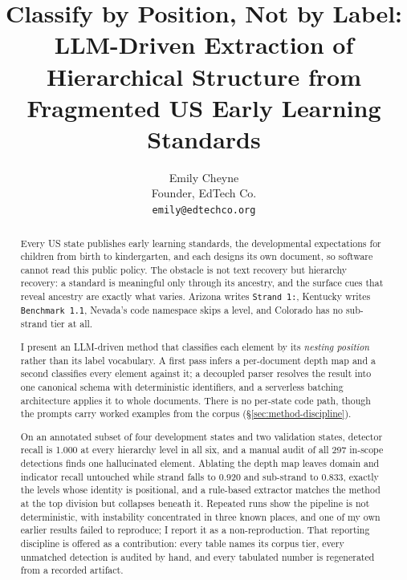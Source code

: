 \documentclass[11pt]{article}
\title{Classify by Position, Not by Label: LLM-Driven Extraction of Hierarchical Structure from Fragmented US Early Learning Standards}
\author{
  Emily Cheyne \\
  Founder, EdTech Co. \\
  \texttt{emily@edtechco.org}
}
\begin{document}
\maketitle

\begin{abstract}
Every US state publishes early learning standards, the developmental
expectations for children from birth to kindergarten, and each designs its
own document, so software cannot read this public policy. The obstacle is not
text recovery but hierarchy recovery: a standard is meaningful only through its
ancestry, and the surface cues that reveal ancestry are exactly what varies.
Arizona writes \texttt{Strand 1:}, Kentucky writes \texttt{Benchmark 1.1},
Nevada's code namespace skips a level, and Colorado has no sub-strand tier at
all.

I present an LLM-driven method that classifies each element by its
\emph{nesting position} rather than its label vocabulary. A first pass infers a
per-document depth map and a second classifies every element against it; a
decoupled parser resolves the result into one canonical schema with
deterministic identifiers, and a serverless batching
architecture applies it to whole documents. There is no per-state code path,
though the prompts carry worked examples from the corpus
(\S\ref{sec:method-discipline}).

On an annotated subset of four development states and two validation states,
detector recall is 1.000 at every hierarchy level in all six, and a manual audit
of all 297 in-scope detections finds one hallucinated element. Ablating the
depth map leaves domain and indicator recall untouched while strand falls to
0.920 and sub-strand to 0.833, exactly the levels whose identity is positional,
and a rule-based extractor matches the method at the top division but collapses
beneath it. Repeated runs show the pipeline is not deterministic, with
instability concentrated in three known places, and one of my own earlier
results failed to reproduce; I report it as a non-reproduction. That reporting
discipline is offered as a contribution: every table names its corpus tier,
every unmatched detection is audited by hand, and every tabulated number is
regenerated from a recorded artifact.
\end{abstract}

\end{document}
